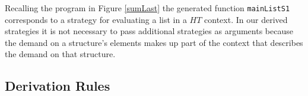 Recalling the program in Figure \ref{sumLast} the generated function
\verb-mainListS1- corresponds to a strategy for evaluating a list in a
$HT$ context. In our derived strategies it is not necessary to pass
additional strategies as arguments because the demand on a structure's elements
makes up part of the context that describes the demand on that structure.

\subsection*{Derivation Rules}


